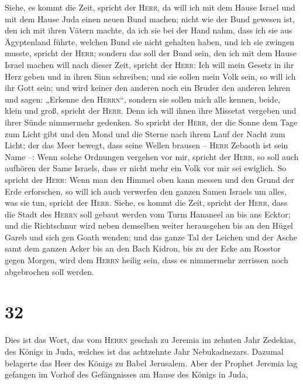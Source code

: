  Siehe, es kommt die Zeit, spricht der \textsc{Herr}, da
will ich mit dem Hause Israel und mit dem Hause Juda einen neuen Bund
machen;  nicht wie der Bund gewesen ist, den ich mit
ihren Vätern machte, da ich sie bei der Hand nahm, dass ich sie aus
Ägyptenland führte, welchen Bund sie nicht gehalten haben, und ich sie
zwingen musste, spricht der \textsc{Herr};  sondern das
soll der Bund sein, den ich mit dem Hause Israel machen will nach dieser
Zeit, spricht der \textsc{Herr}: Ich will mein Gesetz in ihr Herz geben
und in ihren Sinn schreiben; und sie sollen mein Volk sein, so will ich
ihr Gott sein;  und wird keiner den anderen noch ein
Bruder den anderen lehren und sagen: „Erkenne den \textsc{Herrn}``,
sondern sie sollen mich alle kennen, beide, klein und groß, spricht der
\textsc{Herr}. Denn ich will ihnen ihre Missetat vergeben und ihrer
Sünde nimmermehr gedenken.  So spricht der \textsc{Herr},
der die Sonne dem Tage zum Licht gibt und den Mond und die Sterne nach
ihrem Lauf der Nacht zum Licht; der das Meer bewegt, dass seine Wellen
brausen -- \textsc{Herr} Zebaoth ist sein Name --:  Wenn
solche Ordnungen vergehen vor mir, spricht der \textsc{Herr}, so soll
auch aufhören der Same Israels, dass er nicht mehr ein Volk vor mir sei
ewiglich.  So spricht der \textsc{Herr}: Wenn man den
Himmel oben kann messen und den Grund der Erde erforschen, so will ich
auch verwerfen den ganzen Samen Israels um alles, was sie tun, spricht
der \textsc{Herr}.  Siehe, es kommt die Zeit, spricht der
\textsc{Herr}, dass die Stadt des \textsc{Herrn} soll gebaut werden vom
Turm Hananeel an bis ans Ecktor;  und die Richtschnur
wird neben demselben weiter herausgehen bis an den Hügel Gareb und sich
gen Goath wenden;  und das ganze Tal der Leichen und der
Asche samt dem ganzen Acker bis an den Bach Kidron, bis zu der Ecke am
Rosstor gegen Morgen, wird dem \textsc{Herrn} heilig sein, dass es
nimmermehr zerrissen noch abgebrochen soll werden.

\hypertarget{section-31}{%
\section{32}\label{section-31}}

 Dies ist das Wort, das vom \textsc{Herrn} geschah zu
Jeremia im zehnten Jahr Zedekias, des Königs in Juda, welches ist das
achtzehnte Jahr Nebukadnezars.  Dazumal belagerte das Heer
des Königs zu Babel Jerusalem. Aber der Prophet Jeremia lag gefangen im
Vorhof des Gefängnisses am Hause des Königs in Juda,

